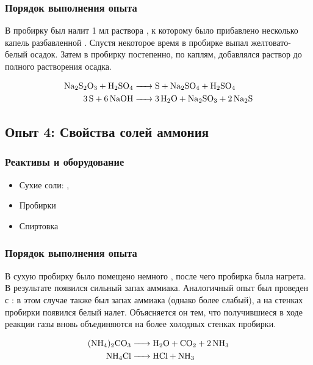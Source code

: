 \documentclass[a4paper, 12pt]{article}
\begin{document}
\subsubsection{Порядок выполнения опыта}

В пробирку был налит 1 мл раствора , к которому было прибавлено несколько капель разбавленной . Спустя некоторое время в пробирке выпал желтовато-белый осадок. Затем в пробирку постепенно, по каплям, добавлялся раствор  до полного растворения осадка. %

\begin{align}
	\ce{Na2S2O3 + H2SO4 &-> S + Na2SO4 + H2SO4}\\
	\ce{3S + 6NaOH &-> 3 H2O + Na2SO3 + 2 Na2S}
\end{align}

\subsection{Опыт 4: Свойства солей аммония}

\subsubsection{Реактивы и оборудование}

\begin{itemize}
	\item Сухие соли: , 
	
	\item Пробирки
	
	\item Спиртовка
\end{itemize}

\subsubsection{Порядок выполнения опыта}

В сухую пробирку было помещено немного , после чего пробирка была нагрета. В результате появился сильный запах аммиака. Аналогичный опыт был проведен с : в этом случае также был запах аммиака (однако более слабый), а на стенках пробирки появился белый налет. Объясняется он тем, что получившиеся в ходе реакции газы вновь объединяются на более холодных стенках пробирки.

\begin{align}
	\ce{(NH4)2CO3 &-> H2O + CO2 + 2 NH3}\\
	\ce{NH4Cl &-> HCl + NH3}
\end{align}
\end{document}
